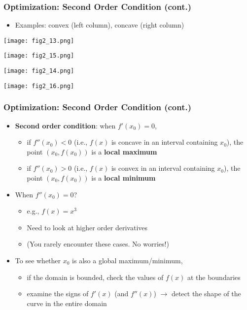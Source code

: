 \documentclass[pdflatex, 12pt]{beamer}
\begin{document}
\begin{frame}
\frametitle{Optimization: Second Order Condition (cont.)}
\begin{itemize}
\item Examples: convex (left column), concave (right column)
\end{itemize}
\begin{minipage}{0.49\textwidth}
\centering
\texttt{[image: fig2\_13.png]}
\end{minipage}
\begin{minipage}{0.49\textwidth}
\centering
\texttt{[image: fig2\_15.png]}
\end{minipage}
\begin{minipage}{0.49\textwidth}
\vspace{0.4cm}
\centering
\texttt{[image: fig2\_14.png]}
\end{minipage}
\begin{minipage}{0.49\textwidth}
\vspace{0.4cm}
\centering
\texttt{[image: fig2\_16.png]}
\end{minipage}
\end{frame}

\begin{frame}
\frametitle{Optimization: Second Order Condition (cont.)}
\begin{itemize}
\item \textbf{Second order condition}: when $f'(x_0) = 0$,
 \begin{itemize}
 \item if $f''(x_0) < 0$ (i.e., $f(x)$ is concave in an interval containing $x_0$), the point $(x_0, f(x_0))$ is a \textbf{local maximum}
 \item if $f''(x_0) > 0$ (i.e., $f(x)$ is convex in an interval containing $x_0$), the point $(x_0, f(x_0))$ is a \textbf{local minimum}
 \end{itemize}
\vspace{0.4cm}
\item When $f''(x_0) = 0$?
 \begin{itemize}
 \item e.g., $f(x) = x^3$
 \item Need to look at higher order derivatives
 \item (You rarely encounter these cases. No worries!)
 \end{itemize}
\vspace{0.4cm}
\item To see whether $x_0$ is also a global maximum/minimum,
 \begin{itemize}
 \item if the domain is bounded, check the values of $f(x)$ at the boundaries
 \item examine the signs of $f'(x)$ (and $f''(x)$) $\rightarrow$ detect the shape of the curve in the entire domain
 \end{itemize}
\end{itemize}
\end{frame}
\end{document}
